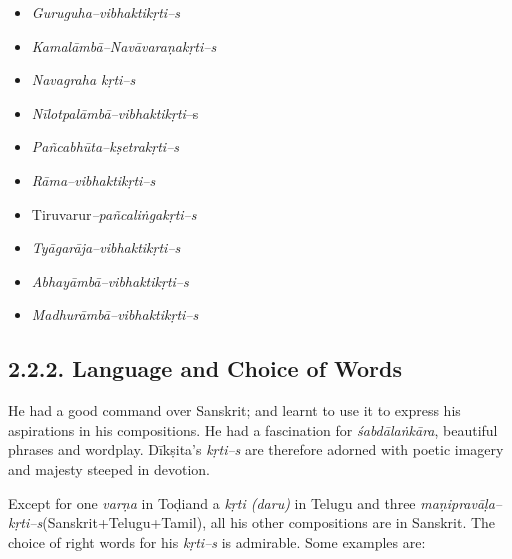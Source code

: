 \begin{itemize}
\itemsep=0pt
\item \textit{Guruguha–vibhaktikṛti–s}

 \item \textit{Kamalāmbā–Navāvaraṇakṛti–s}

 \item \textit{Navagraha kṛti–s}

 \item \textit{Nīlotpalāmbā–vibhaktikṛti}–s

 \item \textit{Pañcabhūta–kṣetrakṛti–s}

 \item \textit{Rāma–vibhaktikṛti–s}

 \item Tiruvarur\textit{–pañcaliṅgakṛti–s}

 \item \textit{Tyāgarāja–vibhaktikṛti–s}

 \item \textit{Abhayāmbā–vibhaktikṛti–s}

 \item \textit{Madhurāmbā–vibhaktikṛti–s}

\end{itemize}



\subsection*{2.2.2. Language and Choice of Words}

He had a good command over Sanskrit; and learnt to use it to express his aspirations in his compositions. He had a fascination for \textit{śabdālaṅkāra}, beautiful phrases and wordplay. Dīkṣita’s \textit{kṛti–s} are therefore adorned with poetic imagery and majesty steeped in devotion.

Except for one \textit{varṇa} in Toḍiand a\textit{ kṛti (daru)} in Telugu and three \textit{maṇipravāḷa– kṛti–s}(Sanskrit+Telugu+Tamil), all his other compositions are in Sanskrit. The choice of right words for his \textit{kṛti–s} is admirable. Some examples are:

